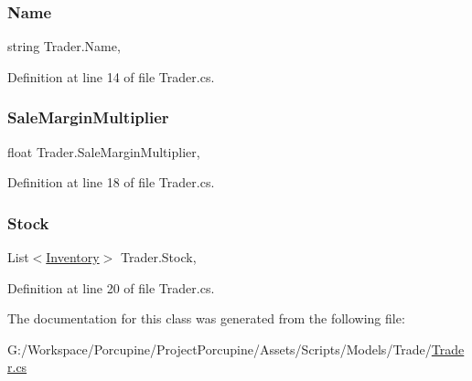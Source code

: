 \mbox{\label{class_trader_a2222005abbbaa8f451545be04ac073da}} 
\subsubsection{\texorpdfstring{Name}{Name}}
{\footnotesize\ttfamily string Trader.\+Name\hspace{0.3cm}{\ttfamily [get]}, {\ttfamily [set]}}



Definition at line 14 of file Trader.\+cs.

\mbox{\label{class_trader_a21872d21fd0f4e201f62bc97d21501e1}} 
\subsubsection{\texorpdfstring{Sale\+Margin\+Multiplier}{SaleMarginMultiplier}}
{\footnotesize\ttfamily float Trader.\+Sale\+Margin\+Multiplier\hspace{0.3cm}{\ttfamily [get]}, {\ttfamily [set]}}



Definition at line 18 of file Trader.\+cs.

\mbox{\label{class_trader_a27280f5dd966850da20e9bc28ccb1c88}} 
\subsubsection{\texorpdfstring{Stock}{Stock}}
{\footnotesize\ttfamily List$<$\hyperlink{class_inventory}{Inventory}$>$ Trader.\+Stock\hspace{0.3cm}{\ttfamily [get]}, {\ttfamily [set]}}



Definition at line 20 of file Trader.\+cs.



The documentation for this class was generated from the following file\+:\begin{DoxyCompactItemize}
\item 
G\+:/\+Workspace/\+Porcupine/\+Project\+Porcupine/\+Assets/\+Scripts/\+Models/\+Trade/\hyperlink{_trader_8cs}{Trader.\+cs}\end{DoxyCompactItemize}
